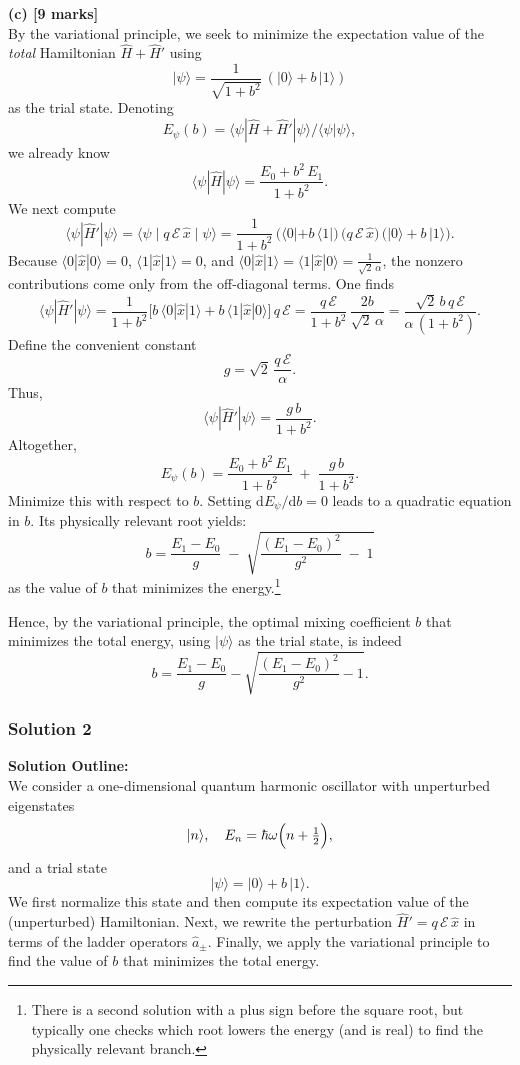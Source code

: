 \documentclass{article}
\begin{document}
\noindent
\textbf{(c) [9 marks]}\\
By the variational principle, we seek to minimize the expectation value of the \emph{total} Hamiltonian \(\hat{H} + \hat{H}'\) using
\[
|\psi\rangle 
= \frac{1}{\sqrt{1 + b^2}}\,(|0\rangle + b\,|1\rangle)
\]
as the trial state. Denoting 
\[
E_\psi(b)
= \langle \psi|\hat{H} + \hat{H}'|\psi\rangle
\Big/\langle\psi|\psi\rangle,
\]
we already know
\[
\langle \psi|\hat{H}|\psi\rangle
= \frac{E_0 + b^2\,E_1}{1 + b^2}.
\]
We next compute
\[
\langle \psi|\hat{H}'|\psi\rangle
= \langle \psi\mid q\,\mathcal{E}\,\hat{x}\mid\psi\rangle
= \frac{1}{1 + b^2}\,
\bigl(\langle 0| + b\,\langle 1|\bigr)\,
\bigl(q\,\mathcal{E}\,\hat{x}\bigr)\,
\bigl(|0\rangle + b\,|1\rangle\bigr).
\]
Because 
\(\langle 0|\hat{x}|0\rangle = 0\),
\(\langle 1|\hat{x}|1\rangle = 0\),
and 
\(\langle 0|\hat{x}|1\rangle = \langle 1|\hat{x}|0\rangle = \tfrac{1}{\sqrt{2}\,\alpha}\),
the nonzero contributions come only from the off-diagonal terms. One finds
\[
\langle \psi|\hat{H}'|\psi\rangle
= \frac{1}{1 + b^2} \bigl[ b\,\langle 0|\hat{x}|1\rangle + b\,\langle 1|\hat{x}|0\rangle \bigr] 
\,q\,\mathcal{E}
= \frac{q\,\mathcal{E}}{1 + b^2}\,\frac{2 b}{\sqrt{2}\,\alpha}
= \frac{\sqrt{2}\,b\,q\,\mathcal{E}}{\alpha\,(1 + b^2)}.
\]
Define the convenient constant
\[
g 
= \sqrt{2}\,\frac{q\,\mathcal{E}}{\alpha}.
\]
Thus,
\[
\langle \psi|\hat{H}'|\psi\rangle
= \frac{g\,b}{1 + b^2}.
\]
Altogether,
\[
E_\psi(b) 
= \frac{ E_0 + b^2\,E_1}{1 + b^2}
\;+\;
\frac{g\,b}{1 + b^2}.
\]
Minimize this with respect to \(b\). Setting \(\mathrm{d}E_\psi/\mathrm{d}b = 0\) leads to a quadratic equation in \(b\). Its physically relevant root yields:
\[
b 
= \frac{E_1 - E_0}{g} \;-\; \sqrt{ \frac{(E_1 - E_0)^2}{g^2} \;-\; 1 }
\]
as the value of \(b\) that minimizes the energy.\footnote{There is a second solution with a plus sign before the square root, but typically one checks which root lowers the energy (and is real) to find the physically relevant branch.}

Hence, by the variational principle, the optimal mixing coefficient \(b\) that minimizes the total energy, using \(|\psi\rangle\) as the trial state, is indeed
\[
b 
= \frac{E_1 - E_0}{g}
- 
\sqrt{\frac{(E_1 - E_0)^2}{g^2} - 1}.
\]

\subsubsection{Solution 2}

\textbf{Solution Outline:}\\
We consider a one-dimensional quantum harmonic oscillator with unperturbed eigenstates
\[
|n\rangle,\quad E_n = \hbar\omega\Bigl(n+\tfrac12\Bigr),
\]
and a trial state
\[
|\psi\rangle = |0\rangle + b\,|1\rangle.
\]
We first normalize this state and then compute its expectation value of the (unperturbed) Hamiltonian. Next, we rewrite the perturbation 
\(\hat{H}' = q\,\mathcal{E}\,\hat{x}\)
in terms of the ladder operators \(\hat{a}_\pm\). Finally, we apply the variational principle to find the value of \(b\) that minimizes the total energy.
\end{document}
